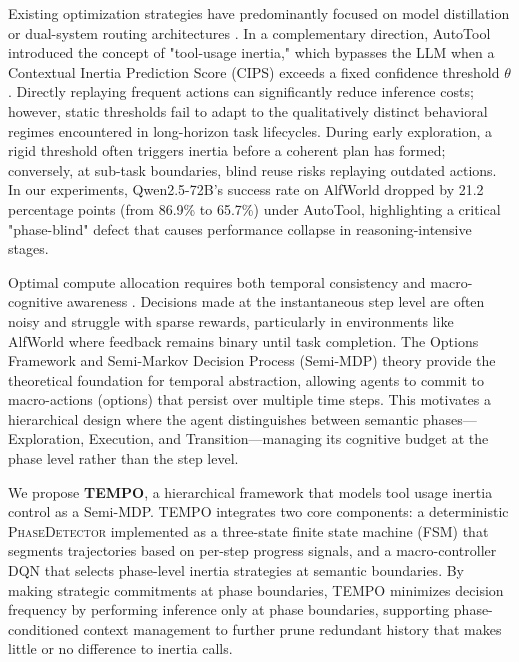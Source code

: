 \documentclass[runningheads]{llncs}
\begin{document}
Existing optimization strategies have predominantly focused on model distillation \cite{agentflan} or dual-system routing architectures \cite{swiftsage}. In a complementary direction, AutoTool \cite{autotool} introduced the concept of "tool-usage inertia," which bypasses the LLM when a Contextual Inertia Prediction Score (CIPS) exceeds a fixed confidence threshold $\theta$. Directly replaying frequent actions can significantly reduce inference costs; however, static thresholds fail to adapt to the qualitatively distinct behavioral regimes encountered in long-horizon task lifecycles. During early exploration, a rigid threshold often triggers inertia before a coherent plan has formed; conversely, at sub-task boundaries, blind reuse risks replaying outdated actions. In our experiments, Qwen2.5-72B’s success rate on AlfWorld dropped by 21.2 percentage points (from 86.9\% to 65.7\%) under AutoTool, highlighting a critical "phase-blind" defect that causes performance collapse in reasoning-intensive stages.

Optimal compute allocation requires both temporal consistency and macro-cognitive awareness \cite{agentlite}. Decisions made at the instantaneous step level are often noisy and struggle with sparse rewards, particularly in environments like AlfWorld where feedback remains binary until task completion. The Options Framework and Semi-Markov Decision Process (Semi-MDP) theory \cite{sutton1999between} provide the theoretical foundation for temporal abstraction, allowing agents to commit to macro-actions (options) that persist over multiple time steps. This motivates a hierarchical design where the agent distinguishes between semantic phases—Exploration, Execution, and Transition—managing its cognitive budget at the phase level rather than the step level.

We propose \textbf{TEMPO}, a hierarchical framework that models tool usage inertia control as a Semi-MDP. TEMPO integrates two core components: a deterministic \textsc{PhaseDetector} implemented as a three-state finite state machine (FSM) that segments trajectories based on per-step progress signals, and a macro-controller DQN that selects phase-level inertia strategies at semantic boundaries. By making strategic commitments at phase boundaries, TEMPO minimizes decision frequency by performing inference only at phase boundaries, supporting phase-conditioned context management to further prune redundant history that makes little or no difference to inertia calls.
\end{document}
